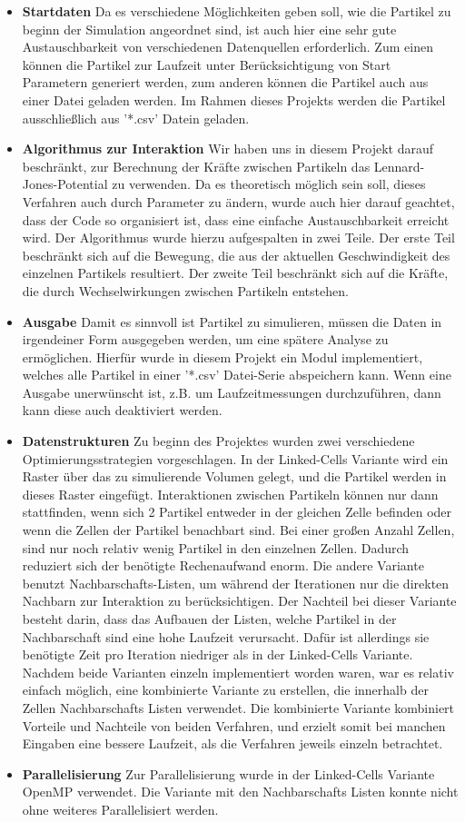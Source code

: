 \documentclass[
	12pt,
	a4paper,
	BCOR10mm,
	DIV14,
	headsepline,
]{scrreprt}
\begin{document}
\begin{itemize}
		\item \textbf{Startdaten} Da es verschiedene Möglichkeiten geben soll, wie die Partikel zu beginn der Simulation angeordnet sind, ist auch hier eine sehr gute Austauschbarkeit von verschiedenen Datenquellen erforderlich. Zum einen können die Partikel zur Laufzeit unter Berücksichtigung von Start Parametern generiert werden, zum anderen können die Partikel auch aus einer Datei geladen werden. Im Rahmen dieses Projekts werden die Partikel ausschließlich aus '*.csv' Datein geladen.
		\item \textbf{Algorithmus zur Interaktion} Wir haben uns in diesem Projekt darauf beschränkt, zur Berechnung der Kräfte zwischen Partikeln das Lennard-Jones-Potential zu verwenden. Da es theoretisch möglich sein soll, dieses Verfahren auch durch Parameter zu ändern, wurde auch hier darauf geachtet, dass der Code so organisiert ist, dass eine einfache Austauschbarkeit erreicht wird. Der Algorithmus wurde hierzu aufgespalten in zwei Teile. Der erste Teil beschränkt sich auf die Bewegung, die aus der aktuellen Geschwindigkeit des einzelnen Partikels resultiert. Der zweite Teil beschränkt sich auf die Kräfte, die durch Wechselwirkungen zwischen Partikeln entstehen.
		\item \textbf{Ausgabe} Damit es sinnvoll ist Partikel zu simulieren, müssen die Daten in irgendeiner Form ausgegeben werden, um eine spätere Analyse zu ermöglichen. Hierfür wurde in diesem Projekt ein Modul implementiert, welches alle Partikel in einer '*.csv' Datei-Serie abspeichern kann. Wenn eine Ausgabe unerwünscht ist, z.B. um Laufzeitmessungen durchzuführen, dann kann diese auch deaktiviert werden.
		\item \textbf{Datenstrukturen} Zu beginn des Projektes wurden zwei verschiedene Optimierungsstrategien vorgeschlagen. In der Linked-Cells Variante wird ein Raster über das zu simulierende Volumen gelegt, und die Partikel werden in dieses Raster eingefügt. Interaktionen zwischen Partikeln können nur dann stattfinden, wenn sich 2 Partikel entweder in der gleichen Zelle befinden oder wenn die Zellen der Partikel benachbart sind. Bei einer großen Anzahl Zellen, sind nur noch relativ wenig Partikel in den einzelnen Zellen. Dadurch reduziert sich der benötigte Rechenaufwand enorm. Die andere Variante benutzt Nachbarschafts-Listen, um während der Iterationen nur die direkten Nachbarn zur Interaktion zu berücksichtigen. Der Nachteil bei dieser Variante besteht darin, dass das Aufbauen der Listen, welche Partikel in der Nachbarschaft sind eine hohe Laufzeit verursacht. Dafür ist allerdings sie benötigte Zeit pro Iteration niedriger als in der Linked-Cells Variante. Nachdem beide Varianten einzeln implementiert worden waren, war es relativ einfach möglich, eine kombinierte Variante zu erstellen, die innerhalb der Zellen Nachbarschafts Listen verwendet. Die kombinierte Variante kombiniert Vorteile und Nachteile von beiden Verfahren, und erzielt somit bei manchen Eingaben eine bessere Laufzeit, als die Verfahren jeweils einzeln betrachtet.
		\item \textbf{Parallelisierung} Zur Parallelisierung wurde in der Linked-Cells Variante OpenMP verwendet. Die Variante mit den Nachbarschafts Listen konnte nicht ohne weiteres Parallelisiert werden.
	\end{itemize}
\end{document}
